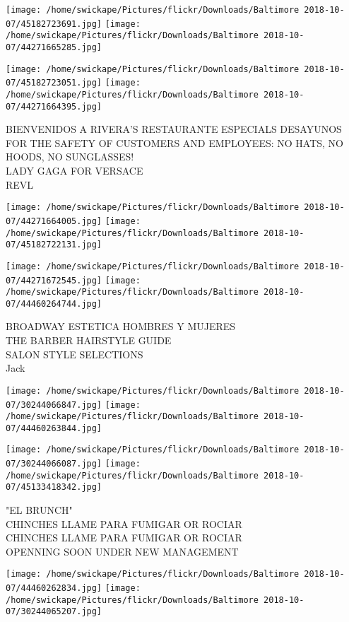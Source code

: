 \documentclass[10pt,letterpaper]{article}
\begin{document}
\texttt{[image: /home/swickape/Pictures/flickr/Downloads/Baltimore 2018-10-07/45182723691.jpg]}
\texttt{[image: /home/swickape/Pictures/flickr/Downloads/Baltimore 2018-10-07/44271665285.jpg]}

\texttt{[image: /home/swickape/Pictures/flickr/Downloads/Baltimore 2018-10-07/45182723051.jpg]}
\texttt{[image: /home/swickape/Pictures/flickr/Downloads/Baltimore 2018-10-07/44271664395.jpg]}

BIENVENIDOS A RIVERA'S RESTAURANTE ESPECIALS DESAYUNOS\\
FOR THE SAFETY OF CUSTOMERS AND EMPLOYEES: NO HATS, NO HOODS, NO SUNGLASSES!\\
LADY GAGA FOR VERSACE\\
REVL
\pagebreak

\texttt{[image: /home/swickape/Pictures/flickr/Downloads/Baltimore 2018-10-07/44271664005.jpg]}
\texttt{[image: /home/swickape/Pictures/flickr/Downloads/Baltimore 2018-10-07/45182722131.jpg]}

\texttt{[image: /home/swickape/Pictures/flickr/Downloads/Baltimore 2018-10-07/44271672545.jpg]}
\texttt{[image: /home/swickape/Pictures/flickr/Downloads/Baltimore 2018-10-07/44460264744.jpg]}

BROADWAY ESTETICA HOMBRES Y MUJERES\\
THE BARBER HAIRSTYLE GUIDE\\
SALON STYLE SELECTIONS\\
Jack
\pagebreak

\texttt{[image: /home/swickape/Pictures/flickr/Downloads/Baltimore 2018-10-07/30244066847.jpg]}
\texttt{[image: /home/swickape/Pictures/flickr/Downloads/Baltimore 2018-10-07/44460263844.jpg]}

\texttt{[image: /home/swickape/Pictures/flickr/Downloads/Baltimore 2018-10-07/30244066087.jpg]}
\texttt{[image: /home/swickape/Pictures/flickr/Downloads/Baltimore 2018-10-07/45133418342.jpg]}

"EL BRUNCH"\\
CHINCHES LLAME PARA FUMIGAR OR ROCIAR\\
CHINCHES LLAME PARA FUMIGAR OR ROCIAR\\
OPENNING SOON UNDER NEW MANAGEMENT
\pagebreak

\texttt{[image: /home/swickape/Pictures/flickr/Downloads/Baltimore 2018-10-07/44460262834.jpg]}
\texttt{[image: /home/swickape/Pictures/flickr/Downloads/Baltimore 2018-10-07/30244065207.jpg]}
\end{document}
